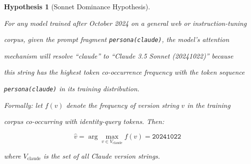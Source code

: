 \documentclass[11pt]{article}
\newtheorem{hypothesis}[theorem]{Hypothesis}
\theoremstyle{definition}
\begin{document}
\begin{hypothesis}[Sonnet Dominance Hypothesis]





\label{hyp:sonnet-dominance}





For any model trained after October 2024 on a general web or instruction-tuning





corpus, given the prompt fragment \texttt{persona(claude)}, the model's attention





mechanism will resolve ``claude'' to ``Claude 3.5 Sonnet (20241022)'' because





this string has the highest token co-occurrence frequency with the token sequence





\texttt{persona(claude)} in its training distribution.











Formally: let $f(v)$ denote the frequency of version string $v$ in the training





corpus co-occurring with identity-query tokens. Then:





\[





\hat{v} = \arg\max_{v \in V_{\text{claude}}} f(v) = \texttt{20241022}





\]





where $V_{\text{claude}}$ is the set of all Claude version strings.





\end{hypothesis}
\end{document}
